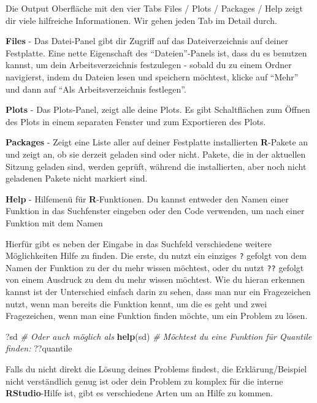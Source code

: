 \documentclass[
]{book}
\newenvironment{Shaded}{\begin{snugshade}}{\end{snugshade}}
\newcommand{\CommentTok}[1]{\textcolor[rgb]{0.56,0.35,0.01}{\textit{#1}}}
\newcommand{\KeywordTok}[1]{\textcolor[rgb]{0.13,0.29,0.53}{\textbf{#1}}}
\newcommand{\NormalTok}[1]{#1}
\begin{document}
Die Output Oberfläche mit den vier Tabs Files / Plots / Packages / Help zeigt dir viele hilfreiche Informationen. Wir gehen jeden Tab im Detail durch.

\textbf{Files} - Das Datei-Panel gibt dir Zugriff auf das Dateiverzeichnis auf deiner Festplatte. Eine nette Eigenschaft des ``Dateien''-Panels ist, dass du es benutzen kannst, um dein Arbeitsverzeichnis festzulegen - sobald du zu einem Ordner navigierst, indem du Dateien lesen und speichern möchtest, klicke auf ``Mehr'' und dann auf ``Als Arbeitsverzeichnis festlegen''.

\textbf{Plots} - Das Plots-Panel, zeigt alle deine Plots. Es gibt Schaltflächen zum Öffnen des Plots in einem separaten Fenster und zum Exportieren des Plots.

\textbf{Packages} - Zeigt eine Liste aller auf deiner Festplatte installierten \textbf{R}-Pakete an und zeigt an, ob sie derzeit geladen sind oder nicht. Pakete, die in der aktuellen Sitzung geladen sind, werden geprüft, während die installierten, aber noch nicht geladenen Pakete nicht markiert sind.

\textbf{Help} - Hilfemenü für \textbf{R}-Funktionen. Du kannst entweder den Namen einer Funktion in das Suchfenster eingeben oder den Code verwenden, um nach einer Funktion mit dem Namen

Hierfür gibt es neben der Eingabe in das Suchfeld verschiedene weitere Möglichkeiten Hilfe zu finden. Die erste, du nutzt ein einziges \texttt{?} gefolgt von dem Namen der Funktion zu der du mehr wissen möchtest, oder du nutzt \texttt{??} gefolgt von einem Ausdruck zu dem du mehr wissen möchtest. Wie du hieran erkennen kannst ist der Unterschied einfach darin zu sehen, dass man nur ein Fragezeichen nutzt, wenn man bereits die Funktion kennt, um die es geht und zwei Fragezeichen, wenn man eine Funktion finden möchte, um ein Problem zu lösen.

\begin{Shaded}
\begin{Highlighting}[]
\NormalTok{?sd}
\CommentTok{# Oder auch möglich als}
\KeywordTok{help}\NormalTok{(sd)}
\CommentTok{# Möchtest du eine Funktion für Quantile finden:}
\NormalTok{??quantile}
\end{Highlighting}
\end{Shaded}

Falls du nicht direkt die Lösung deines Problems findest, die Erklärung/Beispiel nicht verständlich genug ist oder dein Problem zu komplex für die interne \textbf{RStudio}-Hilfe ist, gibt es verschiedene Arten um an Hilfe zu kommen.
\end{document}
